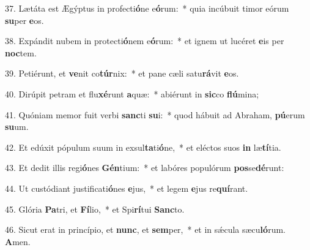 37. Lætáta est Ægýptus in profecti\textbf{ó}ne e\textbf{ó}rum:~*  quia incúbuit timor eórum \textbf{su}per \textbf{e}os.\

38. Expándit nubem in protecti\textbf{ó}nem e\textbf{ó}rum:~*  et ignem ut lucéret \textbf{e}is per \textbf{noc}tem.\

39. Petiérunt, et \textbf{ve}nit co\textbf{túr}nix:~*  et pane cæli satu\textbf{rá}vit \textbf{e}os.\

40. Dirúpit petram et flu\textbf{xé}runt \textbf{a}quæ:~*  abiérunt in \textbf{sic}co \textbf{flú}mina;\

41. Quóniam memor fuit verbi \textbf{sanc}ti \textbf{su}i:~*  quod hábuit ad Abraham, \textbf{pú}erum \textbf{su}um.\

42. Et edúxit pópulum suum in exsul\textbf{ta}ti\textbf{ó}ne,~*  et eléctos suos \textbf{in} læ\textbf{tí}tia.\

43. Et dedit illis regi\textbf{ó}nes \textbf{Gén}tium:~*  et labóres populórum \textbf{pos}se\textbf{dé}runt:\

44. Ut custódiant justificati\textbf{ó}nes \textbf{e}jus,~*  et legem \textbf{e}jus re\textbf{quí}rant.\

45. Glória \textbf{Pa}tri, et \textbf{Fí}lio,~*  et Spi\textbf{rí}tui \textbf{Sanc}to.\

46. Sicut erat in princípio, et \textbf{nunc}, et \textbf{sem}per,~*  et in sǽcula sæcu\textbf{ló}rum. \textbf{A}men.\

